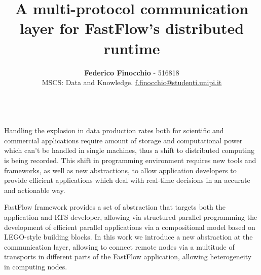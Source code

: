 \documentclass[12pt, oneside]{report}
\title{\vspace{-2cm}\textbf{A multi-protocol communication layer for FastFlow's distributed runtime}}
\author{
    \normalsize{\textbf{Federico Finocchio} - 516818}\\
    \normalsize{MSCS: Data and Knowledge. \underline{f.finocchio@studenti.unipi.it}}\\\\
}
\makeatletter
\renewenvironment{abstract}{%
    \if@twocolumn
      \section*{\abstractname}%
    \else %
      \begin{center}%
        {\bfseries \normalsize\abstractname\vspace{\z@}}%
      \end{center}%
      \quotation
    \fi}
    {\if@twocolumn\else\endquotation\fi}
\makeatother
\begin{document}
\date{}
\maketitle
    
\begin{abstract}
\normalsize
Handling the explosion in data production rates both for scientific and commercial applications require amount of storage and computational power which can't be handled in single machines, thus a shift to distributed computing is being recorded. This shift in programming environment requires new tools and frameworks, as well as new abstractions, to allow application developers to provide efficient applications which deal with real-time decisions in an accurate and actionable way.

FastFlow framework provides a set of abstraction that targets both the application and RTS developer, allowing via structured parallel programming the development of efficient parallel applications via a compositional model based on LEGO-style building blocks. In this work we introduce a new abstraction at the communication layer, allowing to connect remote nodes via a multitude of transports in different parts of the FastFlow application, allowing heterogeneity in computing nodes.
\end{abstract}
\tableofcontents
\newpage
\end{document}

